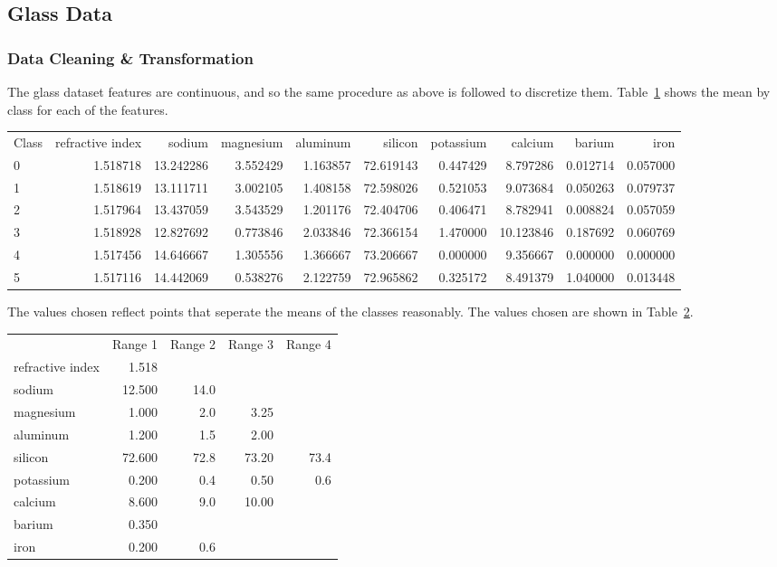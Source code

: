 \documentclass{amsart}
\begin{document}
\subsection{Glass Data}
\subsubsection*{Data Cleaning \& Transformation}
The glass dataset\cite{glassdataset} features are continuous, and so the same procedure as above is followed to discretize them.
Table~\ref{glassmeans} shows the mean by class for each of the features.
\begin{table}
\begin{tabular}{lrrrrrrrrr}
Class &  refractive index &     sodium &  magnesium &  aluminum &    silicon &  potassium &    calcium &    barium &      iron \\
0 &          1.518718 &  13.242286 &   3.552429 &  1.163857 &  72.619143 &   0.447429 &   8.797286 &  0.012714 &  0.057000 \\
1 &          1.518619 &  13.111711 &   3.002105 &  1.408158 &  72.598026 &   0.521053 &   9.073684 &  0.050263 &  0.079737 \\
2 &          1.517964 &  13.437059 &   3.543529 &  1.201176 &  72.404706 &   0.406471 &   8.782941 &  0.008824 &  0.057059 \\
3 &          1.518928 &  12.827692 &   0.773846 &  2.033846 &  72.366154 &   1.470000 &  10.123846 &  0.187692 &  0.060769 \\
4 &          1.517456 &  14.646667 &   1.305556 &  1.366667 &  73.206667 &   0.000000 &   9.356667 &  0.000000 &  0.000000 \\
5 &          1.517116 &  14.442069 &   0.538276 &  2.122759 &  72.965862 &   0.325172 &   8.491379 &  1.040000 &  0.013448
\end{tabular}
\label{glassmeans}
\end{table}
The values chosen reflect points that seperate the means of the classes reasonably. The values chosen are shown in Table~\ref{glass_discrete}.
\begin{table}
\begin{tabular}{lrrrr}
{} &       Range 1 &     Range 2 &      Range 3 &     Range 4 \\
refractive index &   1.518 &   {} &    {} &   {} \\
sodium           &  12.500 &  14.0 &    {} &   {} \\
magnesium        &   1.000 &   2.0 &   3.25 &   {} \\
aluminum         &   1.200 &   1.5 &   2.00 &   {} \\
silicon          &  72.600 &  72.8 &  73.20 &  73.4 \\
potassium        &   0.200 &   0.4 &   0.50 &   0.6 \\
calcium          &   8.600 &   9.0 &  10.00 &   {} \\
barium           &   0.350 &   {} &    {} &   {} \\
iron             &   0.200 &   0.6 &    {} &   {} \\
\end{tabular}
\label{glass_discrete}
\end{table}
\end{document}

